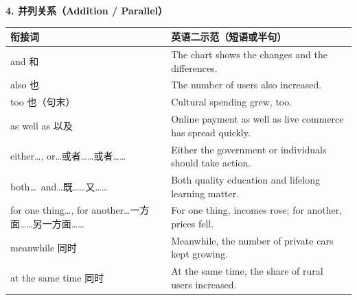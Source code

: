 \documentclass[11pt,a4paper]{ctexart}
\begin{document}
\par\addvspace{6pt}\noindent\textbf{4. 并列关系（Addition / Parallel）}\par\addvspace{2pt}
\begin{longtable}{L{5.4cm}L{10.6cm}}
\toprule
\textbf{衔接词} & \textbf{英语二示范（短语或半句）} \\
\midrule
\endhead
and 和 & The chart shows the changes and the differences. \\
also 也 & The number of users also increased. \\
too 也（句末） & Cultural spending grew, too. \\
as well as 以及 & Online payment as well as live commerce has spread quickly. \\
either\ldots, or\ldots 或者……或者…… & Either the government or individuals should take action. \\
both\ldots\ and\ldots 既……又…… & Both quality education and lifelong learning matter. \\
for one thing\ldots, for another\ldots 一方面……另一方面…… & For one thing, incomes rose; for another, prices fell. \\
meanwhile 同时 & Meanwhile, the number of private cars kept growing. \\
at the same time 同时 & At the same time, the share of rural users increased. \\
\bottomrule
\end{longtable}
\end{document}
